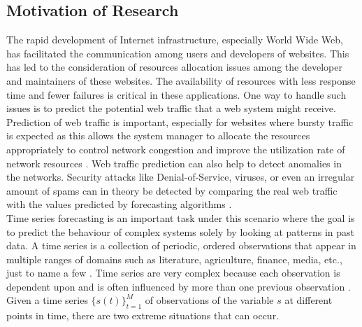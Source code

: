 




    \subsection{Motivation of Research}
  	 The rapid development of Internet infrastructure, especially World Wide Web, has facilitated the communication among users and developers of websites. This has led to the consideration of resources allocation issues among the developer and maintainers of these websites. The availability of resources with less response time and  fewer failures is critical in these applications. One way to handle such issues is to predict the potential web traffic that a web system might receive. 
  	 Prediction of web traffic is important, especially for websites where bursty traffic is expected as this allows the system manager to allocate the resources appropriately  to control network congestion and improve the utilization rate of network resources \cite{learningToPredictWebTraffic, waveletAnalysis}. 
  	 Web traffic prediction can also help to detect anomalies in the networks. Security attacks like Denial-of-Service, viruses, or even an irregular amount of spams can in theory be detected by comparing the real web traffic with the values predicted by forecasting algorithms \cite{Cortez06internettraffic, detectingNetworkAttacks}.\\
  	     Time series forecasting is an important task under this scenario where the goal is to predict the behaviour of complex systems solely by looking at patterns in past data. 
       A time series is a collection of periodic, ordered observations  that appear  in multiple ranges of domains such as literature, agriculture, finance, media, etc., just to name a few \cite{paulo}.  Time series are very complex because each observation is dependent upon and is often influenced by more than one previous observation \cite{anne}.\\
       Given a time series $\{s(t)\}^{M}_{t=1}$ of observations  of the variable $s$ at different points in time, there are two extreme situations that can occur.
       
